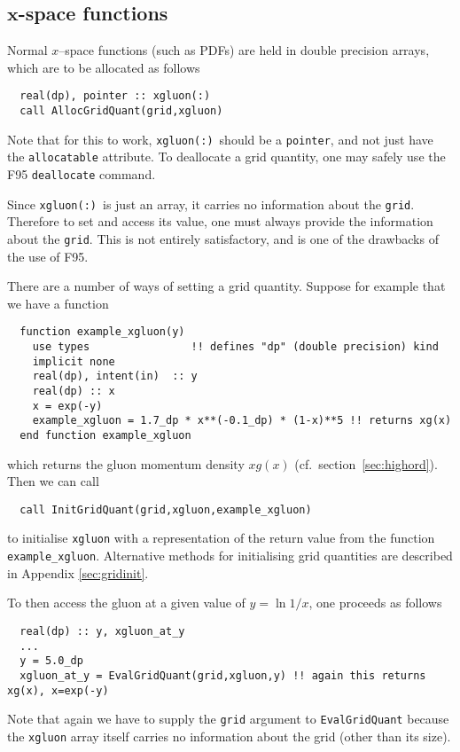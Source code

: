 \documentclass[12pt]{article}
\newcommand{\cf}{cf.\ }
\newcommand{\ttt}[1]{\texttt{#1}}
\begin{document}
\subsection[$x$--space functions]{$\boldsymbol{x}$-space functions}
\label{sec:xspc}

Normal $x$--space functions (such as PDFs) are
held in double precision arrays, which are to be allocated as follows
\begin{lstlisting}
  real(dp), pointer :: xgluon(:)
  call AllocGridQuant(grid,xgluon)
\end{lstlisting}
Note that for this to work, \texttt{xgluon(:)}\ should be a
\texttt{pointer}, and not just 
have the \texttt{allocatable} attribute. To
deallocate a grid quantity, one may safely use the F95
\texttt{deallocate} command.

Since \texttt{xgluon(:)}\ is just an array, it carries no information
about the \texttt{grid}. Therefore to set and access its value, one
must always provide the information about the \texttt{grid}. This is
not entirely satisfactory, and is one of the drawbacks of the use of
F95.

There are a number of ways of setting a grid quantity. Suppose 
for example  that we have
a function
\begin{lstlisting}
  function example_xgluon(y)
    use types                !! defines "dp" (double precision) kind
    implicit none
    real(dp), intent(in)  :: y
    real(dp) :: x    
    x = exp(-y)
    example_xgluon = 1.7_dp * x**(-0.1_dp) * (1-x)**5 !! returns xg(x)  
  end function example_xgluon
\end{lstlisting}
which
returns the gluon
momentum density $xg(x)$ (\cf section~\ref{sec:highord}).
%
Then we can call
\begin{lstlisting}
  call InitGridQuant(grid,xgluon,example_xgluon)
\end{lstlisting}
to initialise \texttt{xgluon} with a representation of the return value
from the function \texttt{example\_xgluon}.
Alternative methods for initialising grid quantities
are described in Appendix \ref{sec:gridinit}.

To then access the gluon at a given value of $y = \ln 1/x$, one
proceeds as follows
\begin{lstlisting}
  real(dp) :: y, xgluon_at_y
  ...
  y = 5.0_dp
  xgluon_at_y = EvalGridQuant(grid,xgluon,y) !! again this returns xg(x), x=exp(-y)
\end{lstlisting}
Note that again we have to supply 
the \texttt{grid} argument to \ttt{EvalGridQuant}
because the \ttt{xgluon} array itself carries no information about the
grid (other than its size).
\end{document}
